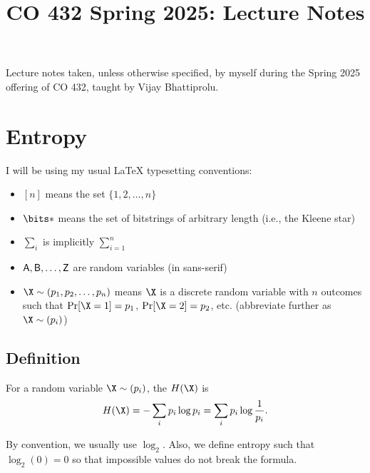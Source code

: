 \documentclass[class=co432,notes,tikz]{agony}
\title{CO 432 Spring 2025: Lecture Notes}
\begin{document}
\renewcommand{\contentsname}{CO 432 Spring 2025:\\{\huge Lecture Notes}}
\thispagestyle{firstpage}
\tableofcontents

Lecture notes taken, unless otherwise specified,
by myself during the Spring 2025 offering of CO 432,
taught by Vijay Bhattiprolu.

\begin{multicols}{2}
  \listoflecture
\end{multicols}

\chapter{Entropy}

\begin{notation}
  I will be using my usual \LaTeX{} typesetting conventions:
  \begin{itemize}[nosep]
    \item $[n]$ means the set $\{1,2,\dotsc,n\}$
    \item $\bits*$ means the set of bitstrings of arbitrary length (i.e., the Kleene star)
    \item $\sum_i$ is implicitly $\sum_{i=1}^n$
    \item $\mathsf A, \mathsf B, \dotsc, \mathsf Z$ are random variables (in sans-serif)
    \item $\X \sim (p_1,p_2,\dotsc,p_n)$ means $\X$ is a
          discrete random variable with $n$ outcomes
          such that $\Pr[\X = 1] = p_1$, $\Pr[\X=2] = p_2$, etc.
          (abbreviate further as $\X \sim (p_i)$)
  \end{itemize}
\end{notation}

\section{Definition}


\begin{defn}[entropy]
  For a random variable $\X \sim (p_i)$,
  the  $H(\X)$ is
  \[ H(\X) = -\sum_i p_i \log p_i = \sum_i p_i \log \frac{1}{p_i}. \]
\end{defn}

\begin{convention}
  By convention, we usually use $\log_2$.
  Also, we define entropy such that $\log_2(0) = 0$ so that
  impossible values do not break the formula.
\end{convention}
\end{document}
